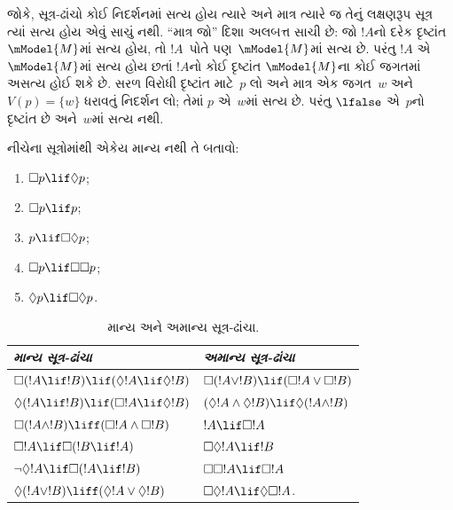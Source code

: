 જોકે, સૂત્ર-ઢાંચો કોઈ નિદર્શનમાં સત્ય હોય ત્યારે
અને માત્ર ત્યારે જ તેનું લક્ષણરૂપ સૂત્ર ત્યાં સત્ય
હોય એવું સાચું નથી. ``માત્ર જો'' દિશા અલબત્ત સાચી છે:
જો $!A$નો દરેક દૃષ્ટાંત~$\mModel{M}$માં સત્ય હોય,
તો $!A$~પોતે પણ~$\mModel{M}$માં સત્ય છે. પરંતુ
$!A$ એ~$\mModel{M}$માં સત્ય હોય છતાં $!A$નો કોઈ દૃષ્ટાંત
$\mModel{M}$ના કોઈ જગતમાં અસત્ય હોઈ શકે છે. સરળ
વિરોધી દૃષ્ટાંત માટે~$p$ લો અને માત્ર એક જગત~$w$ અને
$V(p) = \{w\}$ ધરાવતું નિદર્શન લો; તેમાં $p$
એ~$w$માં સત્ય છે. પરંતુ $\lfalse$ એ~$p$નો
દૃષ્ટાંત છે અને~$w$માં સત્ય નથી.

\begin{prob}
  નીચેના સૂત્રોમાંથી એકેય માન્ય નથી તે બતાવો:
  \begin{enumerate}
    \item[\Ax{D}:] \quad $\Box p \lif \Diamond p$;
    \item[\Ax{T}:] \quad $\Box p \lif p$;
    \item[\Ax{B}:] \quad $p \lif \Box\Diamond p$;
    \item[\Ax{4}:] \quad $\Box p \lif \Box \Box p$;
    \item[\Ax{5}:] \quad $\Diamond p \lif \Box \Diamond
      p$.
  \end{enumerate}
\end{prob}

\begin{table}[t]
    \centering
    \begin{tabular}{| l || l |}
      \hline
      {\emph{માન્ય સૂત્ર-ઢાંચા}} & {\emph{અમાન્ય સૂત્ર-ઢાંચા}} \\
      \hline\hline
      $\Box(!A \lif !B) \lif (\Diamond !A \lif \Diamond !B)$
      & $\Box (!A \lor !B) \lif (\Box !A \lor \Box !B)$ \\
      $\Diamond (!A \lif !B) \lif (\Box !A \lif \Diamond
      !B)$
      & $(\Diamond !A \land \Diamond !B) \lif \Diamond (!A
      \land !B)$\\
      $\Box (!A \land !B) \liff (\Box !A \land \Box !B)$
      & $!A \lif \Box !A$ \\
      $\Box !A \lif \Box (!B \lif !A)$
      & $\Box \Diamond !A \lif !B$ \\
      $\lnot \Diamond !A \lif \Box (!A \lif !B)$
      & $\Box \Box !A \lif \Box !A$ \\
      $\Diamond (!A \lor !B) \liff (\Diamond !A \lor
      \Diamond !B)$
      & $\Box \Diamond !A \lif \Diamond \Box !A$. \\
      \hline
    \end{tabular}
    \caption{માન્ય અને અમાન્ય સૂત્ર-ઢાંચા.}
\end{table}

